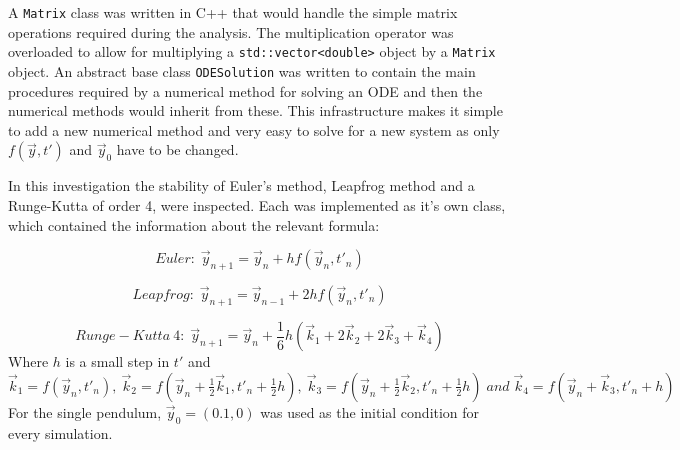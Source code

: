 \documentclass[10pt,a4paper]{article}
\begin{document}
A \texttt{Matrix} class was written in C++ that would handle the simple matrix operations required during the analysis. The multiplication operator was overloaded to allow for multiplying a \texttt{std::vector<double>} object by a \texttt{Matrix} object. An abstract base class \texttt{ODESolution} was written to contain the main procedures required by a numerical method for solving an ODE and then the numerical methods would inherit from these. This infrastructure makes it simple to add a new numerical method and very easy to solve for a new system as only $f(\vec{y}, t')$ and $\vec{y}_{0}$ have to be changed.

In this investigation the stability of Euler's method, Leapfrog method and a Runge-Kutta of order 4, were inspected. Each was implemented as it's own class, which contained the information about the relevant formula:

\begin{equation}
Euler: \; \vec{y}_{n+1} = \vec{y}_{n} + hf(\vec{y}_{n}, t'_{n}) 
\end{equation}

\begin{equation}
Leapfrog: \; \vec{y}_{n+1} = \vec{y}_{n-1} + 2hf(\vec{y}_{n}, t'_{n})
\end{equation}

\begin{equation}
Runge-Kutta\: 4: \; \vec{y}_{n+1} = \vec{y}_{n} + \frac{1}{6}h(\vec{k}_{1}+2\vec{k}_{2}+2\vec{k}_{3}+\vec{k}_{4}) 
\end{equation}
Where $h$ is a small step in $t'$ and \\

\begin{math}
\vec{k}_{1} = f(\vec{y}_{n}, t'_{n}),\: \vec{k}_{2} = f(\vec{y}_{n}+\frac{1}{2}\vec{k}_{1}, t'_{n}+\frac{1}{2}h),\: \vec{k}_{3} = f(\vec{y}_{n}+\frac{1}{2}\vec{k}_{2}, t'_{n}+\frac{1}{2}h) \; and \;
\vec{k}_{4} = f(\vec{y}_{n}+\vec{k}_{3}, t'_{n}+h)
\end{math}
\\
For the single pendulum, $\vec{y}_{0} = (0.1,0)$ was used as the initial condition for every simulation.
\end{document}
